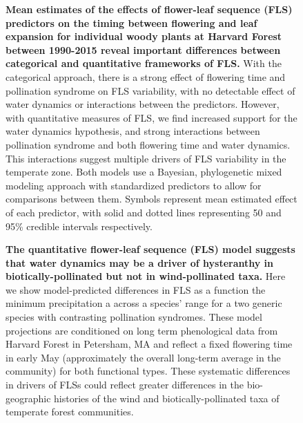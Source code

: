 \documentclass[12pt]{article}
\begin{document}
 \begin{figure}[h!]
        \centering
          \caption{\textbf{Mean estimates of the effects of flower-leaf sequence (FLS) predictors on the timing between flowering and leaf expansion for individual woody plants at Harvard Forest between 1990-2015 reveal important differences between categorical and quantitative frameworks of FLS.}  With the categorical approach, there is a strong effect of flowering time and pollination syndrome on FLS variability, with no detectable effect of water dynamics or interactions between the predictors. However, with quantitative measures of FLS, we find increased support for the water dynamics hypothesis, and strong interactions between pollination syndrome and both flowering time and water dynamics. This interactions suggest multiple drivers of FLS variability in the temperate zone.  Both models use a Bayesian, phylogenetic mixed modeling approach with standardized predictors to allow for comparisons between them. Symbols represent mean estimated effect of each predictor, with solid and dotted lines representing 50 and 95\% credible intervals respectively.}  
        \label{fig:muplots.HF}
    \end{figure}    

    

 \begin{figure}[h!] 
        \centering
           \caption{\textbf{The quantitative flower-leaf sequence (FLS) model suggests that water dynamics may be a driver of hysteranthy in biotically-pollinated but not in wind-pollinated taxa.} Here we show model-predicted differences in FLS as a function the minimum precipitation a across a species' range for a two generic species with contrasting pollination syndromes. These model projections are conditioned on long term phenological data from Harvard Forest in Petersham, MA \citep{OKeefe2015} and reflect a fixed flowering time in early May (approximately the overall long-term average in the community) for both functional types. These systematic differences in drivers of FLSs could reflect greater differences in the bio-geographic histories of the wind and biotically-pollinated taxa of temperate forest communities.}
        \label{fig:apcs}
    \end{figure}


    
\end{document}
